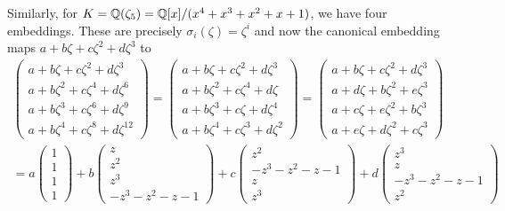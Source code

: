 \begin{example}
		Similarly, for $K = \mathbb{Q}(\zeta_5) = \mathbb{Q}[x]/(x^4 +x^3 +x^2+x +1)$, we have four embeddings. These are precisely $\sigma_i(\zeta) = \zeta^i$ and now the canonical embedding maps $a + b\zeta + c\zeta^2 + d\zeta^3$ to
	\begin{align*}
		\begin{pmatrix}
		a + b\zeta + c\zeta^2 +d \zeta^3 \\
		a + b\zeta^2 + c\zeta^4 +d \zeta^6 \\
		a + b\zeta^3 + c\zeta^6 +d \zeta^9 \\
		a + b\zeta^4 + c\zeta^8 +d \zeta^{12}
		\end{pmatrix} = \begin{pmatrix}
		a + b\zeta + c\zeta^2 + d\zeta^3 \\
		a + b\zeta^2 + c\zeta^4 + d\zeta \\ 
		a + b\zeta^3 + c\zeta + d\zeta^4 \\
		a + b\zeta^4 + c\zeta^3 + d\zeta^2
		\end{pmatrix} =
		\begin{pmatrix}
		a + b\zeta + c\zeta^2 + d\zeta^3 \\
		a + d\zeta + b\zeta^2 + e\zeta^3 \\
		a + c\zeta + e\zeta^2 + b\zeta^3  \\
		a + e\zeta + d\zeta^2 + c\zeta^3 
		\end{pmatrix} \\
		= a \begin{pmatrix} 1\\1\\1\\1 \end{pmatrix}
		+ b \begin{pmatrix} z \\z^2\\z^3\\-z^3-z^2-z-1 \end{pmatrix}
		+ c \begin{pmatrix} z^2 \\-z^3-z^2-z-1\\z\\z^3 \end{pmatrix}
		+ d \begin{pmatrix} z^3 \\z\\-z^3-z^2-z-1\\z^2 \end{pmatrix}
	\end{align*}
\end{example}

